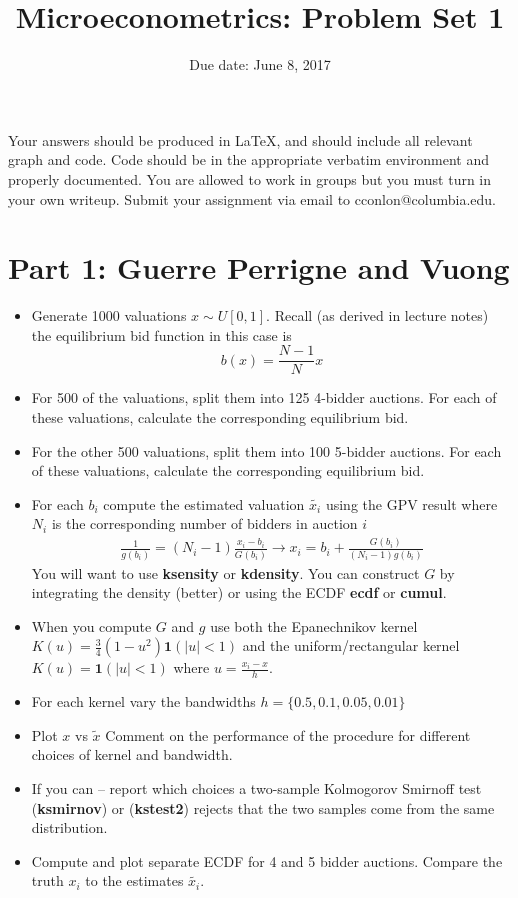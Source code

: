 \documentclass{article}
\title{Microeconometrics: Problem Set 1}
\begin{document}
\small
\date{Due date: June 8, 2017}
\maketitle
Your answers should be produced in \LaTeX, and should include all relevant graph and code.  Code should be in the appropriate verbatim environment and properly documented. You are allowed to work in groups but you must turn in your own writeup. Submit your assignment via email to cconlon@columbia.edu.

\section*{Part 1: Guerre Perrigne and Vuong}
\begin{itemize}
\item Generate 1000 valuations $x \sim U [0, 1]$. Recall (as derived in lecture notes) the equilibrium bid function in this case is
$$b(x) =\frac{N-1}{N} x$$
\item For 500 of the valuations, split them into 125 4-bidder auctions. For each of these valuations, calculate the corresponding equilibrium bid.
\item For the other 500 valuations, split them into 100 5-bidder auctions. For each of these valuations, calculate the corresponding equilibrium bid.
\item For each $b_i$ compute the estimated valuation $\tilde{x_i}$ using the GPV result where $N_i$ is the corresponding number of bidders in auction $i$
\begin{eqnarray*}
\frac{1}{g(b_i)} = (N_i -1) \frac{x_i - b_i}{G(b_i)} \rightarrow x_i = b_i + \frac{G(b_i)}{(N_i -1) g(b_i)}
\end{eqnarray*}
You will want to use \textbf{ksensity} or \textbf{kdensity}. You can construct $G$ by integrating the density (better) or using the ECDF \textbf{ecdf} or \textbf{cumul}.
\item When you compute $G$ and $g$ use both the Epanechnikov kernel $K(u)  = \frac{3}{4} ( 1 -u^2) \mathbf{1}(|u| < 1)$ and the uniform/rectangular kernel $K(u)  = \mathbf{1}(|u| < 1)$
where $u = \frac{x_i - x}{h}$.
\item For each kernel vary the bandwidths $h = \{0.5, 0.1,0.05,0.01\}$
\item Plot $x$ vs $\tilde{x}$ Comment on the performance of the procedure for different choices of kernel and bandwidth.
\item If you can -- report which choices a two-sample Kolmogorov Smirnoff test (\textbf{ksmirnov}) or (\textbf{kstest2}) rejects that the two samples come from the same distribution.
\item Compute and plot separate ECDF for 4 and 5 bidder auctions.  Compare the truth $x_i$ to the estimates $\tilde{x_i}$.
\end{itemize}
\end{document}
